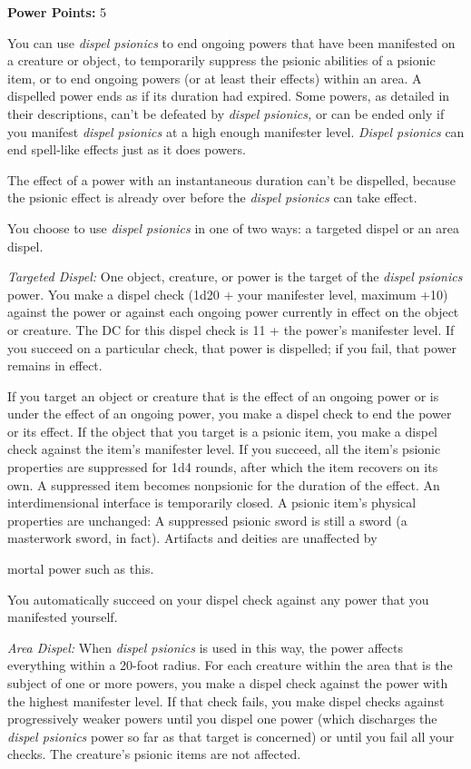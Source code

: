 \documentclass{article}
\begin{document}
\textbf{Power Points:} 5

You can use \textit{dispel psionics }to end ongoing powers that have been manifested 
on a creature or object, to temporarily suppress the psionic abilities of a psionic 
item, or to end ongoing powers (or at least their effects) within an area. A dispelled 
power ends as if its duration had expired. Some powers, as detailed in their descriptions, 
can't be defeated by \textit{dispel psionics, }or can be ended only if you manifest 
\textit{dispel psionics }at a high enough manifester level. \textit{Dispel psionics 
}can end spell-like effects just as it does powers.

The effect of a power with an instantaneous duration can't be dispelled, because 
the psionic effect is already over before the \textit{dispel psionics }can take 
effect.

You choose to use \textit{dispel psionics }in one of two ways: a targeted dispel 
or an area dispel.

\textit{Targeted Dispel: }One object, creature, or power is the target of the \textit{dispel 
psionics }power. You make a dispel check (1d20 + your manifester level, maximum 
+10) against the power or against each ongoing power currently in effect on the 
object or creature. The DC for this dispel check is 11 + the power's manifester 
level. If you succeed on a particular check, that power is dispelled; if you fail, 
that power remains in effect.

If you target an object or creature that is the effect of an ongoing power or is 
under the effect of an ongoing power, you make a dispel check to end the power 
or its effect. If the object that you target is a psionic item, you make a dispel 
check against the item's manifester level. If you succeed, all the item's psionic 
properties are suppressed for 1d4 rounds, after which the item recovers on its 
own. A suppressed item becomes nonpsionic for the duration of the effect. An interdimensional 
interface  is temporarily closed. A psionic item's physical properties are unchanged: 
A suppressed psionic sword is still a sword (a masterwork sword, in fact). Artifacts 
and deities are unaffected by

mortal power such as this.

You automatically succeed on your dispel check against any power that you manifested 
yourself.

\textit{Area Dispel: }When \textit{dispel psionics }is used in this way, the power 
affects everything within a 20-foot radius. For each creature within the area that 
is the subject of one or more powers, you make a dispel check against the power 
with the highest manifester level. If that check fails, you make dispel checks 
against progressively weaker powers until you dispel one power (which discharges 
the \textit{dispel psionics }power so far as that target is concerned) or until 
you fail all your checks. The creature's psionic items are not affected.
\end{document}
